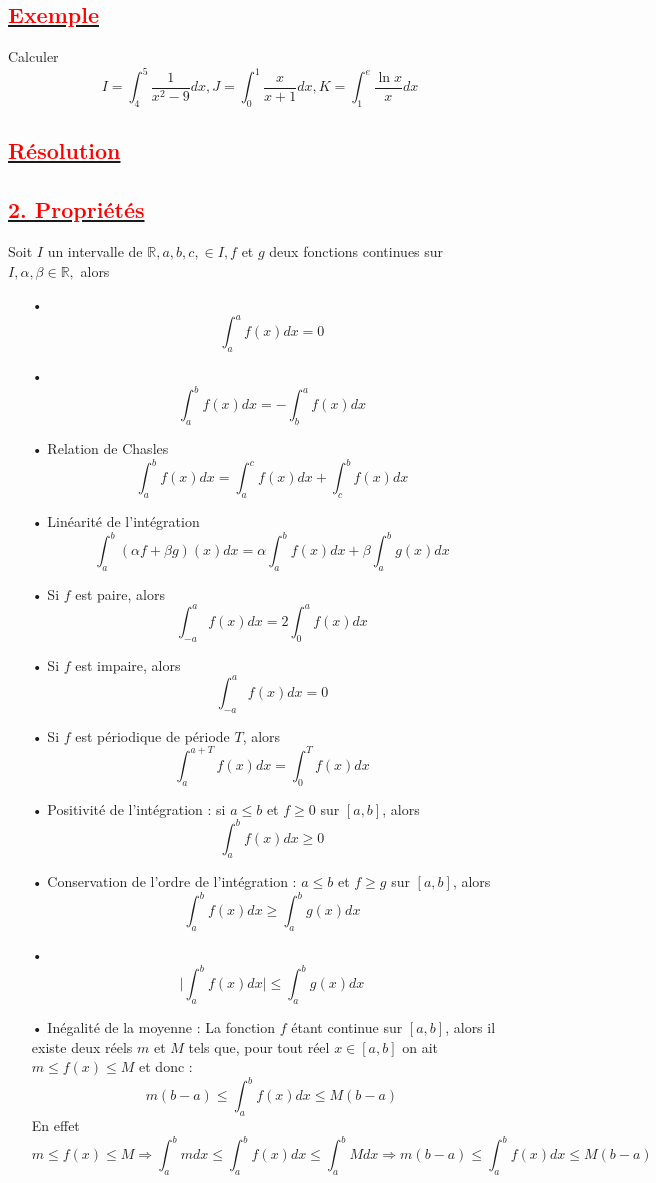 \documentclass[12pt]{article}
\begin{document}
\subsection*{\underline{\textbf{\textcolor{red}{Exemple  }}}}
Calculer
\[I=\int_{4}^{5}\frac{1}{x^{2}-9}dx , J=\int_{0}^{1}\frac{x}{x+1}dx, K=\int_{1}^{e}\frac{\ln x}{x}dx\]
\subsection*{\underline{\textbf{\textcolor{red}{Résolution }}}}
\subsection*{\underline{\textbf{\textcolor{red}{2. Propriétés }}}}
Soit $I$ un intervalle de $\mathbb{R}, a, b, c, \in I, f$ et $g$ deux fonctions continues sur $I, \alpha, \beta \in \mathbb{R},$ alors
\begin{itemize}
\item[•] \[\int_{a}^{a}f(x)dx=0\]
\item[•] \[\int_{a}^{b}f(x)dx=-\int_{b}^{a}f(x)dx\]
\item[•] Relation de Chasles \[\int_{a}^{b}f(x)dx=\int_{a}^{c}f(x)dx+\int_{c}^{b}f(x)dx\]
\item[•] Linéarité de l'intégration \[\int_{a}^{b}(\alpha f+\beta g)(x)dx=
\alpha \int_{a}^{b}f(x)dx+\beta\int_{a}^{b}g(x)dx \]
\item[•] Si $f$ est paire, alors \[\int_{-a}^{a}f(x)dx=2\int_{0}^{a}f(x)dx \]
\item[•] Si $f$ est impaire, alors \[\int_{-a}^{a}f(x)dx=0\]
\item[•] Si $f$ est périodique de période $T$, alors
\[\int_{a}^{a+T}f(x)dx=\int_{0}^{T}f(x)dx\]
\item[•] Positivité de l'intégration : si $a\leq b$ et $f\geq 0$ sur $[a, b]$, alors
\[\int_{a}^{b}f(x)dx\geq 0\]
\item[•] Conservation de l'ordre de l'intégration : $a\leq b$ et $f\geq g$ sur $[a, b]$, alors \[\int_{a}^{b}f(x)dx\geq \int_{a}^{b}g(x)dx \]
\item[•] \[\mid\int_{a}^{b}f(x)dx\mid\leq \int_{a}^{b}g(x)dx \]
\item[•]  Inégalité de la moyenne : La fonction $f$ étant continue sur $[a, b]$, alors il existe deux réels $m$ et $M$ tels que, pour tout réel $x\in [a, b]$ on ait $m\leq f(x)\leq M$ et donc : \[m(b-a)\leq \int_{a}^{b}f(x)dx \leq M(b-a)\] 
En effet
\[m\leq f(x)\leq M \Longrightarrow \int_{a}^{b}mdx \leq \int_{a}^{b}f(x)dx \leq \int_{a}^{b}Mdx \Longrightarrow m(b-a)\leq \int_{a}^{b}f(x)dx \leq M(b-a)\]
\end{itemize}
\end{document}

